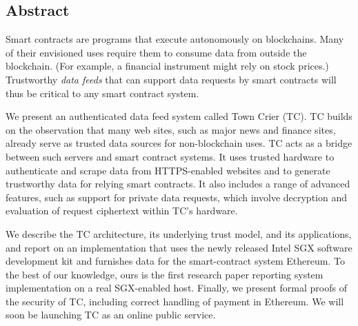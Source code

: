\subsection*{Abstract}
Smart contracts are programs that execute autonomously on blockchains. Many of their envisioned uses require them to consume data from outside the blockchain. (For example, a financial instrument might rely on stock prices.) Trustworthy {\em data feeds} that can support data requests by smart contracts will thus be critical to any smart contract system. 

	We present an authenticated data feed system called Town Crier (TC). TC builds on the observation that many web sites, such as major news and finance sites, already serve as trusted data sources for non-blockchain uses. TC acts as a bridge between such servers and smart contract systems. It uses trusted hardware to authenticate and scrape data from HTTPS-enabled websites and to generate trustworthy data for relying smart contracts. It also includes a range of advanced features, such as support for private data requests, which involve decryption and evaluation of request ciphertext  within TC's hardware.
	
	We describe the TC architecture, its underlying trust model, and its applications, and report on an implementation that uses the newly released Intel SGX software development kit and furnishes data for the smart-contract system Ethereum.  To the best of our knowledge, ours is the first research paper reporting system implementation on a real SGX-enabled host. Finally, we present formal proofs of the security of TC, including correct handling of payment in Ethereum. We will soon be launching TC as an online public service.

